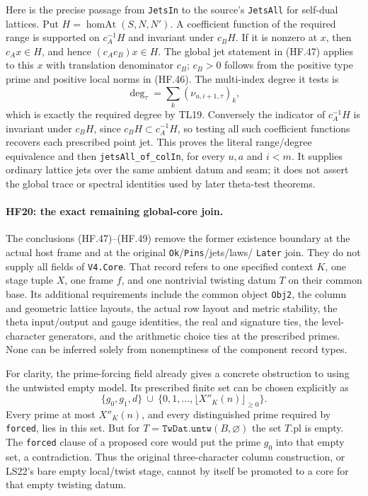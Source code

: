 Here is the precise passage from \texttt{JetsIn}
to the source's \texttt{JetsAll} for self-dual
lattices. Put $H=\operatorname{homAt}(S,N,N')$.
A coefficient function of the required range
is supported on $c_A^{-1}H$ and invariant under
$c_BH$. If it is nonzero at $x$, then $c_Ax\in H$,
and hence $(c_Ac_B)x\in H$. The global jet
statement in (HF.47) applies to this $x$ with
translation denominator $c_B$; $c_B>0$ follows
from the positive type prime and positive local
norms in (HF.46). The multi-index degree it tests
is
\[
 \deg_\tau=\sum_k(\nu_{u,i+1,\tau})_k,
 \tag{HF.50}
\]
which is exactly the required degree by TL19.
Conversely the indicator of $c_A^{-1}H$ is
invariant under $c_BH$, since $c_BH\subset
c_A^{-1}H$, so testing all such coefficient
functions recovers each prescribed point jet.
This proves the literal range/degree equivalence
and then \texttt{jetsAll\_of\_colIn}, for every
$u,a$ and $i<m$. It supplies ordinary lattice
jets over the same ambient datum and seam;
it does not assert the global trace or spectral
identities used by later theta-test theorems.

\paragraph{HF20: the exact remaining global-core join.}
The conclusions (HF.47)--(HF.49) remove the former
existence boundary at the actual host frame and
at the original \texttt{Ok}/\texttt{Pins}/jets/laws/
\texttt{Later} join. They do not supply all fields
of \texttt{V4.Core}. That record refers to one
specified context $K$, one stage tuple $X$,
one frame $f$, and one nontrivial twisting datum
$T$ on their common base. Its additional
requirements include the common object
\texttt{Obj2}, the column and geometric lattice
layouts, the actual row layout and metric
stability, the theta input/output and gauge
identities, the real and signature ties, the
level-character generators, and the arithmetic
choice ties at the prescribed primes.
None can be inferred solely from nonemptiness
of the component record types.

For clarity, the prime-forcing field already
gives a concrete obstruction to using the
untwisted empty model. Its prescribed finite
set can be chosen explicitly as
\[
 \{g_0,g_1,d\}\ \cup\
       \{0,1,\ldots,\lfloor X''_K(n)\rfloor_{\ge0}\}.
 \tag{HF.51}
\]
Every prime at most $X''_K(n)$, and every
distinguished prime required by \texttt{forced},
lies in this set. But for
$T=\texttt{TwDat.untw}(B,\varnothing)$ the set
$T.\mathrm{pl}$ is empty. The \texttt{forced}
clause of a proposed core would put the prime
$g_0$ into that empty set, a contradiction.
Thus the original three-character column
construction, or LS22's bare empty local/twist
stage, cannot by itself be promoted to a core
for that empty twisting datum.

